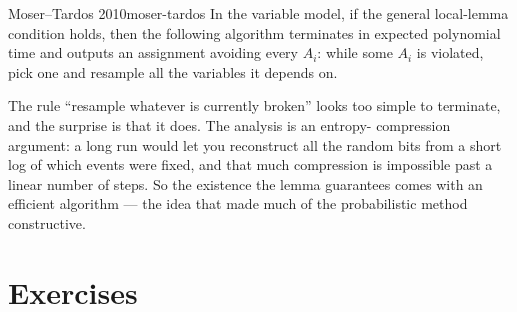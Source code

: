 \begin{theorem}{Moser--Tardos 2010}{moser-tardos}
In the variable model, if the general local-lemma condition holds, then the
following algorithm terminates in expected polynomial time and outputs an
assignment avoiding every $A_i$: while some $A_i$ is violated, pick one and
resample all the variables it depends on.
\end{theorem}

\begin{insight}
The rule ``resample whatever is currently broken'' looks too simple to
terminate, and the surprise is that it does. The analysis is an entropy-%
compression argument: a long run would let you reconstruct all the random bits
from a short log of which events were fixed, and that much compression is
impossible past a linear number of steps. So the existence the lemma guarantees
comes with an efficient algorithm --- the idea that made much of the probabilistic
method constructive.
\end{insight}

\section*{Exercises}

